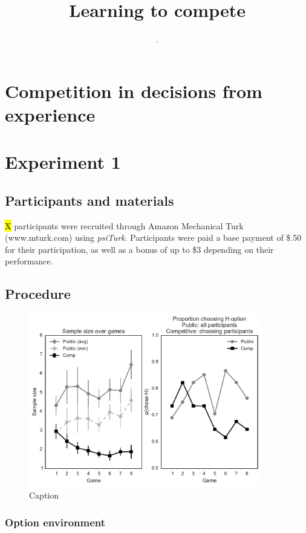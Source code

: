 \documentclass[11pt,jou]{apa6}
\title{Learning to compete}
\author{.}
\affiliation{.}
\begin{document}
\maketitle




\section{Competition in decisions from experience}

\cite{phillips2014rivals}

\section{Experiment 1}

\subsection{Participants and materials}

\hl{X} participants were recruited through Amazon Mechanical Turk (www.mturk.com) using \emph{psiTurk}.
Participants were paid a base payment of \$.50 for their participation, as well as a bonus of up to \$3 depending on their performance.

\subsection{Procedure}

\begin{figure}[ht]
\centerline{\includegraphics[width=4in]{figures/exp1_results.pdf}}
\caption{Caption}
\label{exp1_results.fig}
\end{figure}

\subsubsection{Option environment}
\end{document}
